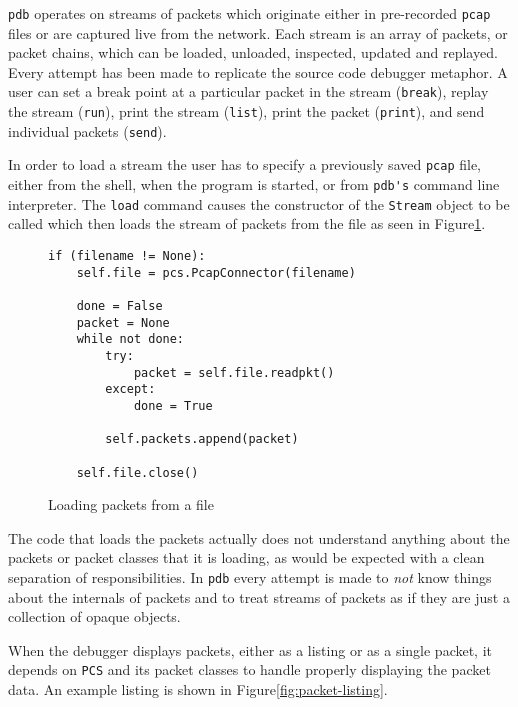\documentclass[pdftex]{article}
\begin{document}
\verb|pdb| operates on streams of packets which originate either in
pre-recorded \verb|pcap| files or are captured live from the
network.  Each stream is an array of packets, or packet chains, which
can be loaded, unloaded, inspected, updated and replayed.  Every
attempt has been made to replicate the source code debugger metaphor.
A user can set a break point at a particular packet in the stream
(\verb|break|), replay the stream (\verb|run|), print the stream
(\verb|list|), print the packet (\verb|print|), and send individual
packets (\verb|send|).

In order to load a stream the user has to specify a previously saved
\verb|pcap| file, either from the shell, when the program is
started, or from \verb|pdb's| command line interpreter.  The
\verb|load| command causes the constructor of the \verb|Stream|
object to be called which then loads the stream of packets from the
file as seen in Figure\ref{fig:loading-packets-from-a-file}.

\begin{figure}
  \centering
\begin{lstlisting}
if (filename != None):
    self.file = pcs.PcapConnector(filename)

    done = False
    packet = None
    while not done:
        try:
            packet = self.file.readpkt()
        except:
            done = True

        self.packets.append(packet)

    self.file.close()
  \end{lstlisting}
  \caption{Loading packets from a file}
  \label{fig:loading-packets-from-a-file}
\end{figure}

The code that loads the packets actually does not understand anything
about the packets or packet classes that it is loading, as would be
expected with a clean separation of responsibilities.  In \verb|pdb|
every attempt is made to \emph{not} know things about the internals of
packets and to treat streams of packets as if they are just a
collection of opaque objects.

When the debugger displays packets, either as a listing or as a single
packet, it depends on \verb|PCS| and its packet classes to handle
properly displaying the packet data.  An example listing is shown in
Figure\ref{fig:packet-listing}.
\end{document}
